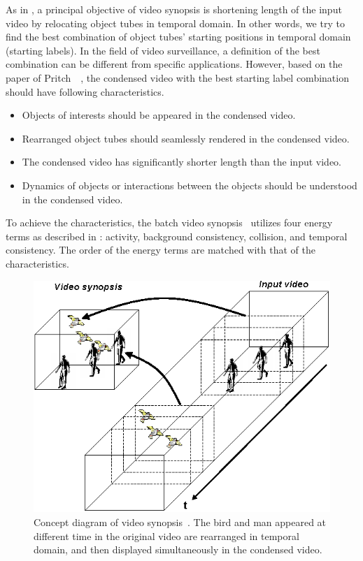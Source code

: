\documentclass[11pt]{hyu_thesis}
\begin{document}
As in , a principal objective of video synopsis is shortening length of the input video by relocating object tubes in temporal domain. In other words, we try to find the best combination of object tubes' starting positions in temporal domain (starting labels). In the field of video surveillance, a definition of the best combination can be different from specific applications. However, based on the paper of Pritch~\etal~\cite{Pritch2008}, the condensed video with the best starting label combination should have following characteristics.
\begin{itemize}
\item Objects of interests should be appeared in the condensed video.
\item Rearranged object tubes should seamlessly rendered in the condensed video.
\item The condensed video has significantly shorter length than the input video.
\item Dynamics of objects or interactions between the objects should be understood in the condensed video.
\end{itemize}
To achieve the characteristics, the batch video synopsis~\cite{Pritch2008} utilizes four energy terms as described in : activity, background consistency, collision, and temporal consistency. The order of the energy terms are matched with that of the characteristics.

\begin{figure}
	\begin{center}
		\includegraphics[width=\linewidth]{ext-rav-acha.eps}
	\end{center}
	\caption{Concept diagram of video synopsis~\cite{Rav-Acha2006}. The bird and man appeared at different time in the original video are rearranged in temporal domain, and then displayed simultaneously in the condensed video.}
	\label{fig:Rav-Acha}
\end{figure}
\end{document}
